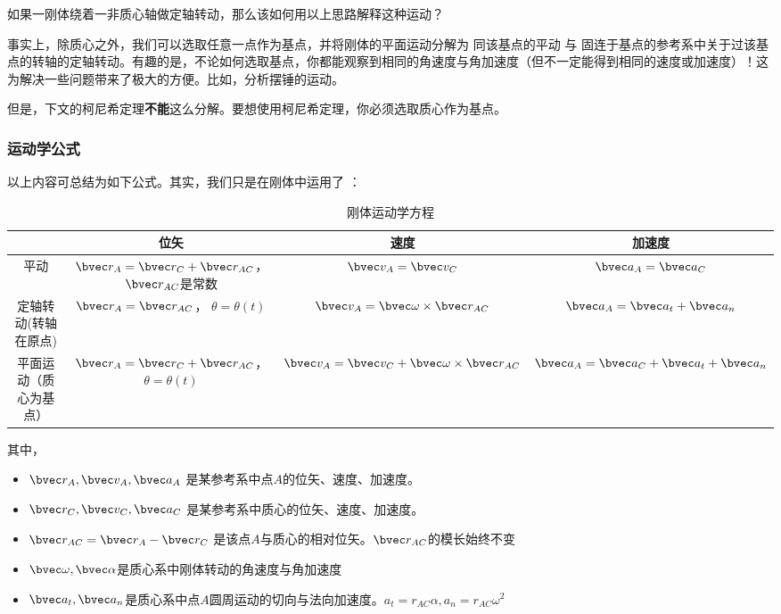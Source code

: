 \begin{exercise}{}
如果一刚体绕着一非质心轴做定轴转动，那么该如何用以上思路解释这种运动？
\end{exercise}

事实上，除质心之外，我们可以选取任意一点作为基点，并将刚体的平面运动分解为 同该基点的平动 与 固连于基点的参考系中关于过该基点的转轴的定轴转动。有趣的是，不论如何选取基点，你都能观察到相同的角速度与角加速度（但不一定能得到相同的速度或加速度）！这为解决一些问题带来了极大的方便。比如，分析摆锤的运动。

但是，下文的柯尼希定理\textbf{不能}这么分解。要想使用柯尼希定理，你必须选取质心作为基点。

\subsubsection{运动学公式}
以上内容可总结为如下公式。其实，我们只是在刚体中运用了 ：
\begin{table}[ht]
\centering
\caption{刚体运动学方程}\label{tab_RGAB_2}
\begin{tabular}{|c|c|c|c|}
\hline
 & 位矢 & 速度  & 加速度 \\
\hline
平动 & $\bvec r_A = \bvec r_C + \bvec r_{AC}$， $\bvec r_{AC}$是常数 & $\bvec v_A = \bvec v_C$ & $\bvec a_A = \bvec a_C$ \\
\hline
定轴转动(转轴在原点) & $\bvec r_A = \bvec r_{AC}$， $\theta =\theta (t)$ & $\bvec v_A = \bvec \omega \times \bvec r_{AC}$ & $\bvec a_A = \bvec a_t + \bvec a_n$\\
\hline
平面运动（质心为基点） & $\bvec r_A = \bvec r_C + \bvec r_{AC}$， $\theta =\theta (t)$& $\bvec v_A = \bvec v_C + \bvec \omega \times \bvec r_{AC}$ & $\bvec a_A = \bvec a_C + \bvec a_t + \bvec a_n$ \\
\hline
\end{tabular}
\end{table}
其中，
\begin{itemize}
\item $\bvec r_A, \bvec v_A, \bvec a_A$ 是某参考系中点$A$的位矢、速度、加速度。
\item $\bvec r_C, \bvec v_C, \bvec a_C$ 是某参考系中质心的位矢、速度、加速度。
\item $\bvec r_{AC} = \bvec r_A -\bvec r_C $ 是该点$A$与质心的相对位矢。$\bvec r_{AC}$的模长始终不变
\item $\bvec \omega, \bvec \alpha$是质心系中刚体转动的角速度与角加速度 
\item $\bvec a_t, \bvec a_n$是质心系中点$A$圆周运动的切向与法向加速度。$a_t=r_{AC}\alpha, a_n=r_{AC}\omega^2$
 
\end{itemize}

